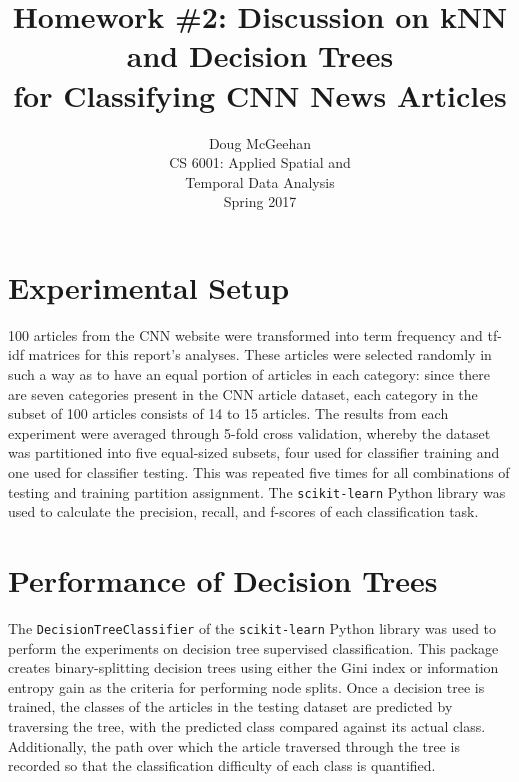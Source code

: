 \documentclass[11pt]{article}
\title{Homework \#2: Discussion on kNN and Decision Trees\\ for Classifying CNN News Articles}
\author{Doug McGeehan\\
		CS 6001: Applied Spatial and \\ Temporal Data Analysis\\
		Spring 2017}
\begin{document}
\maketitle

\section{Experimental Setup}

100 articles from the CNN website were transformed into term frequency and tf-idf matrices for this report's analyses.
These articles were selected randomly in such a way as to have an equal portion of articles in each category: since there are seven categories present in the CNN article dataset, each category in the subset of 100 articles consists of 14 to 15 articles.
The results from each experiment were averaged through 5-fold cross validation,
 whereby the dataset was partitioned into five equal-sized subsets, four used for classifier training and one used for classifier testing.
This was repeated five times for all combinations of testing and training partition assignment.
The \texttt{scikit-learn} Python library was used to calculate the precision, recall, and f-scores of each classification task.

\section{Performance of Decision Trees}

The \texttt{DecisionTreeClassifier} of the \texttt{scikit-learn} Python library was used to perform the experiments on decision tree supervised classification.
This package creates binary-splitting decision trees using either the Gini index or information entropy gain as the criteria for performing node splits.
Once a decision tree is trained, the classes of the articles in the testing dataset are predicted by traversing the tree, with the predicted class compared against its actual class.
Additionally, the path over which the article traversed through the tree is recorded so that the classification difficulty of each class is quantified.
\end{document}
